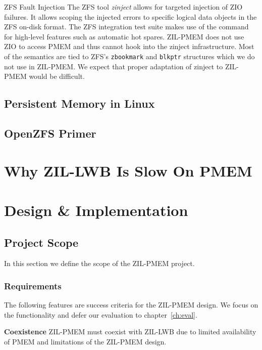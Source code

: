 \documentclass[12pt,a4paper,twoside,draft]{book}
\begin{document}
ZFS Fault Injection
The ZFS tool \textit{zinject} allows for targeted injection of ZIO failures.
It allows scoping the injected errors to specific logical data objects in the ZFS on-disk format.
The ZFS integration test suite makes use of the command for high-level features such as automatic hot spares.
ZIL-PMEM does not use ZIO to access PMEM and thus cannot hook into the zinject infrastructure.
Most of the semantics are tied to ZFS’s \lstinline{zbookmark} and \lstinline{blkptr} structures which we do not use in ZIL-PMEM.
We expect that proper adaptation of zinject to ZIL-PMEM would be difficult.

\section{Persistent Memory in Linux}
\blindtext{}

\section{OpenZFS Primer}
\blindtext{}

\chapter{Why ZIL-LWB Is Slow On PMEM}\label{ch:lwb_analysis}
\blindtext{}

\chapter{Design \& Implementation}
\blindtext{}

\section{Project Scope}
In this section we define the scope of the ZIL-PMEM project.

\newcommand{\csgoal}[1]{\textbf{#1}}

\subsection{Requirements}\label{sec:requirements}
The following features are success criteria for the ZIL-PMEM design.
We focus on the functionality and defer our evaluation to chapter~\ref{ch:eval}.

\csgoal{Coexistence}
ZIL-PMEM must coexist with ZIL-LWB due to limited availability of PMEM and limitations of the ZIL-PMEM design.
\end{document}
